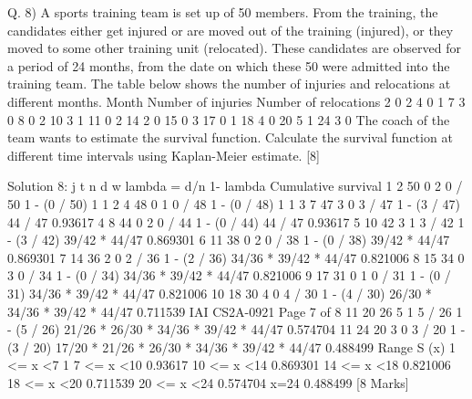 Q. 8) A sports training team is set up of 50 members. From the training, the candidates either
get injured or are moved out of the training (injured), or they moved to some other training
unit (relocated).
These candidates are observed for a period of 24 months, from the date on which these 50
were admitted into the training team. The table below shows the number of injuries and
relocations at different months.
Month Number of injuries Number of relocations
2 0 2
4 0 1
7 3 0
8 0 2
10 3 1
11 0 2
14 2 0
15 0 3
17 0 1
18 4 0
20 5 1
24 3 0
The coach of the team wants to estimate the survival function. Calculate the survival
function at different time intervals using Kaplan-Meier estimate. [8]


Solution 8:
j
t
n
d
w
lambda = d/n
1- lambda
Cumulative survival
1
2
50
0
2
0 / 50
1 - (0 / 50)
1
1
2
4
48
0
1
0 / 48
1 - (0 / 48)
1
1
3
7
47
3
0
3 / 47
1 - (3 / 47)
44 / 47
0.93617
4
8
44
0
2
0 / 44
1 - (0 / 44)
44 / 47
0.93617
5
10
42
3
1
3 / 42
1 - (3 / 42)
39/42 * 44/47
0.869301
6
11
38
0
2
0 / 38
1 - (0 / 38)
39/42 * 44/47
0.869301
7
14
36
2
0
2 / 36
1 - (2 / 36)
34/36 * 39/42 * 44/47
0.821006
8
15
34
0
3
0 / 34
1 - (0 / 34)
34/36 * 39/42 * 44/47
0.821006
9
17
31
0
1
0 / 31
1 - (0 / 31)
34/36 * 39/42 * 44/47
0.821006
10
18
30
4
0
4 / 30
1 - (4 / 30)
26/30 * 34/36 * 39/42 * 44/47
0.711539
IAI CS2A-0921
Page 7 of 8
11
20
26
5
1
5 / 26
1 - (5 / 26)
21/26 * 26/30 * 34/36 * 39/42 * 44/47
0.574704
11
24
20
3
0
3 / 20
1 - (3 / 20)
17/20 * 21/26 * 26/30 * 34/36 * 39/42 * 44/47
0.488499
Range
S (x)
1 <= x <7
1
7 <= x <10
0.93617
10 <= x <14
0.869301
14 <= x <18
0.821006
18 <= x <20
0.711539
20 <= x <24
0.574704
x=24
0.488499
[8 Marks]
